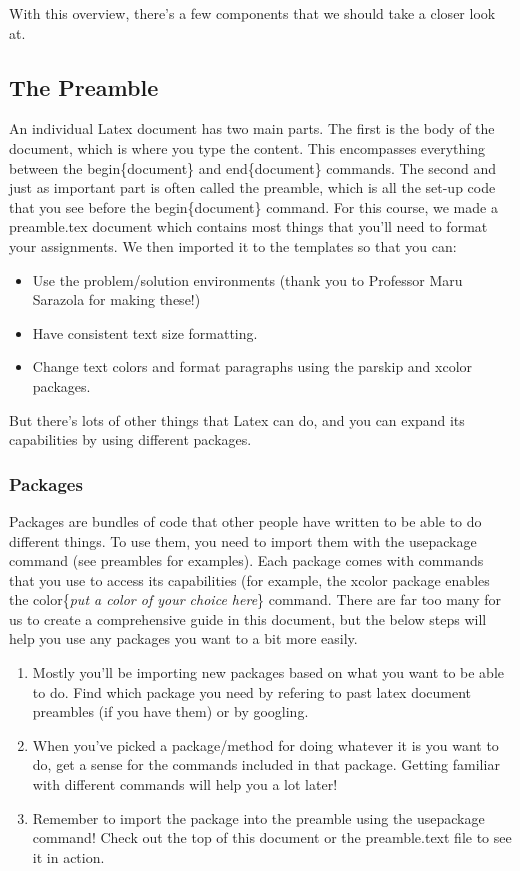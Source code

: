 \documentclass[11 pt]{article}
\begin{document}
With this overview, there's a few components that we should take a closer look at.

\subsection{The Preamble}

An individual Latex document has two main parts. The first is the body of the document, which is where you type the content. This encompasses everything between the begin\{document\} and end\{document\} commands. The second and just as important part is often called the preamble, which is all the set-up code that you see before the begin\{document\} command. For this course, we made a preamble.tex document which contains most things that you'll need to format your assignments. We then imported it to the templates so that you can:
\begin{itemize}
    \item Use the problem/solution environments (thank you to Professor Maru Sarazola for making these!)
    \item Have consistent text size formatting.
    \item Change text colors and format paragraphs using the parskip and xcolor packages.
\end{itemize}

But there's lots of other things that Latex can do, and you can expand its capabilities by using different packages. 

\subsubsection{Packages}

Packages are bundles of code that other people have written to be able to do different things. To use them, you need to import them with the usepackage command (see preambles for examples). Each package comes with commands that you use to access its capabilities (for example, the xcolor package enables the color\{\textit{put a color of your choice here}\} command. There are far too many for us to create a comprehensive guide in this document, but the below steps will help you use any packages you want to a bit more easily.
\begin{enumerate}
    \item Mostly you'll be importing new packages based on what you want to be able to do. Find which package you need by refering to past latex document preambles (if you have them) or by googling.
    \item When you've picked a package/method for doing whatever it is you want to do, get a sense for the commands included in that package. Getting familiar with different commands will help you a lot later!
    \item Remember to import the package into the preamble using the usepackage command! Check out the top of this document or the preamble.text file to see it in action.
\end{enumerate}
\end{document}
